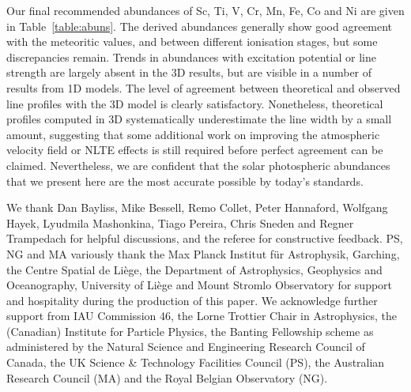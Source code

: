 \documentclass[traditabstract]{aa}
\begin{document}
Our final recommended abundances of Sc, Ti, V, Cr, Mn, Fe, Co and Ni are given in Table~\ref{table:abuns}.
The derived abundances generally show good agreement with the meteoritic values, and 
between different ionisation stages, but some discrepancies remain.  Trends in abundances with 
excitation potential or line strength are largely absent in the 3D results, but are visible in a number of results 
from 1D models.  The level of agreement between theoretical and observed line profiles with the 3D model is clearly satisfactory.  
Nonetheless, theoretical profiles computed in 3D systematically underestimate the line width by a small amount, suggesting 
that some additional work on improving the atmospheric velocity field or NLTE effects is still required before perfect 
agreement can be claimed. Nevertheless, we are confident that the solar photospheric abundances that we present here are the most accurate possible by today's standards. 


\begin{acknowledgements}
We thank Dan Bayliss, Mike Bessell, Remo Collet, Peter Hannaford, Wolfgang Hayek, Lyudmila Mashonkina, Tiago Pereira, Chris Sneden and Regner Trampedach for helpful discussions, and the referee for constructive feedback.  PS, NG and MA variously thank the Max Planck Institut f\"ur Astrophysik, Garching, the Centre Spatial de Li\`ege, the Department of Astrophysics, Geophysics and Oceanography, University of Li\`ege and Mount Stromlo Observatory for support and hospitality during the production of this paper.  We acknowledge further support from IAU Commission 46, the Lorne Trottier Chair in Astrophysics, the (Canadian) Institute for Particle Physics, the Banting Fellowship scheme as administered by the Natural Science and Engineering Research Council of Canada, the UK Science \& Technology Facilities Council (PS), the Australian Research Council (MA) and the Royal Belgian Observatory (NG).
\end{acknowledgements}



\Online
\end{document}
